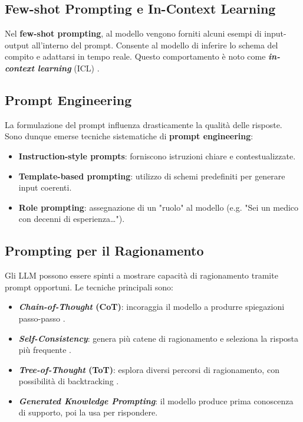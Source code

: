 \subsection{Few-shot Prompting e In-Context Learning}
Nel \textbf{few-shot prompting}, al modello vengono forniti alcuni esempi 
di input-output all'interno del prompt. Consente al modello di inferire lo schema del compito e adattarsi in tempo reale.
Questo comportamento è noto come \textbf{\textit{in-context learning}} (ICL) \cite{dong2023survey}.

\subsection{Prompt Engineering}
La formulazione del prompt influenza drasticamente la qualità delle risposte.
Sono dunque emerse tecniche sistematiche di \textbf{prompt engineering}:
\begin{itemize}
    \item \textbf{Instruction-style prompts}: forniscono istruzioni chiare e contestualizzate.
    \item \textbf{Template-based prompting}: utilizzo di schemi predefiniti per generare input coerenti.
    \item \textbf{Role prompting}: assegnazione di un "ruolo" al modello (e.g. "Sei un medico con decenni di esperienza…").
\end{itemize}

\subsection{Prompting per il Ragionamento}
Gli LLM possono essere spinti a mostrare capacità di ragionamento tramite prompt opportuni.
Le tecniche principali sono:
\begin{itemize}
    \item \textbf{\textit{Chain-of-Thought} (CoT)}: incoraggia il modello a produrre spiegazioni passo-passo \cite{wei2022chain}.
    \item \textbf{\textit{Self-Consistency}}: genera più catene di ragionamento e seleziona la risposta più frequente \cite{wang2022selfconsistency}.
    \item \textbf{\textit{Tree-of-Thought} (ToT)}: esplora diversi percorsi di ragionamento, con possibilità di backtracking \cite{yao2023tree}.
    \item \textbf{\textit{Generated Knowledge Prompting}}: il modello produce prima conoscenza di supporto, poi la usa per rispondere.
\end{itemize}

